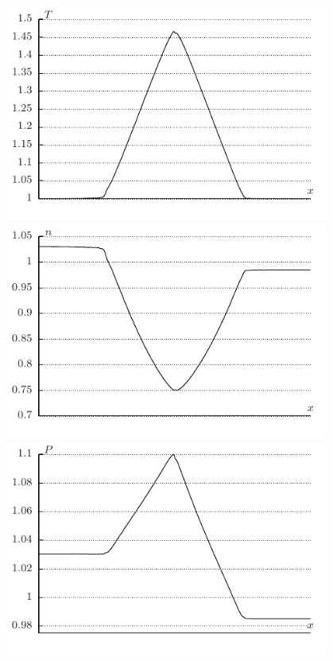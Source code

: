 \documentclass[ucs]{beamer}
\begin{document}
\begin{frame}
\begin{columns}[c]
\begin{figure}
	\end{figure}
		\includegraphics[height=0.25\paperheight]{1kT2x}\newline
		\includegraphics[height=0.25\paperheight]{1kn2x}\newline
		\includegraphics[height=0.25\paperheight]{1kP2x}\newline
	\end{columns}
\end{frame}
\end{document}
